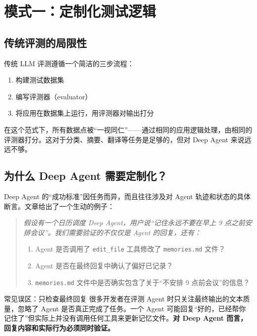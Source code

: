 \section{模式一：定制化测试逻辑}

\subsection{传统评测的局限性}

传统 LLM 评测遵循一个简洁的三步流程：

\begin{enumerate}
  \item 构建测试数据集
  \item 编写评测器（evaluator）
  \item 将应用在数据集上运行，用评测器对输出打分
\end{enumerate}

在这个范式下，所有数据点被``一视同仁''——通过相同的应用逻辑处理，由相同的评测器打分。这对于分类、摘要、翻译等任务是足够的，但对 Deep Agent 来说远远不够。

\subsection{为什么 Deep Agent 需要定制化？}

Deep Agent 的``成功标准''因任务而异，而且往往涉及对 Agent 轨迹和状态的具体断言。文章给出了一个生动的例子：

\begin{quote}
\textit{假设有一个日历调度 Deep Agent，用户说``记住永远不要在早上 9 点之前安排会议''。我们需要验证的不仅仅是 Agent 的回复，还有：}
\begin{enumerate}
  \item Agent 是否调用了 \texttt{edit\_file} 工具修改了 \texttt{memories.md} 文件？
  \item Agent 是否在最终回复中确认了偏好已记录？
  \item \texttt{memories.md} 文件中是否确实包含了关于``不安排 9 点前会议''的信息？
\end{enumerate}
\end{quote}

\begin{warningbox}{常见误区：只检查最终回复}
很多开发者在评测 Agent 时只关注最终输出的文本质量，忽略了 Agent 是否真正完成了任务。一个 Agent 可能回复``好的，已经帮你记住了''但实际上并没有调用任何工具来更新记忆文件。\textbf{对 Deep Agent 而言，回复内容和实际行为必须同时验证。}
\end{warningbox}

